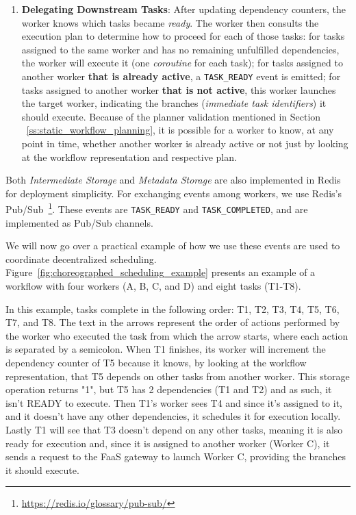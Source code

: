 \documentclass[conference]{IEEEtran}
\begin{document}
\begin{enumerate}
    \item \textbf{Delegating Downstream Tasks}: After updating dependency counters, the worker knows which tasks became \textit{ready}. The worker then consults the execution plan to determine how to proceed for each of those tasks: for tasks assigned to the same worker and has no remaining unfulfilled dependencies, the worker will execute it (one \textit{coroutine} for each task); for tasks assigned to another worker \textbf{that is already active}, a \texttt{TASK\_READY} event is emitted; for tasks assigned to another worker \textbf{that is not active}, this worker launches the target worker, indicating the branches (\textit{immediate task identifiers}) it should execute. Because of the planner validation mentioned in Section ~\ref{ss:static_workflow_planning}, it is possible for a worker to know, at any point in time, whether another worker is already active or not just by looking at the workflow representation and respective plan.
\end{enumerate}

Both \textit{Intermediate Storage} and \textit{Metadata Storage} are also implemented in Redis for deployment simplicity. For exchanging events among workers, we use Redis's Pub/Sub~\footnote{\url{https://redis.io/glossary/pub-sub/}}. These events are \texttt{TASK\_READY} and \texttt{TASK\_COMPLETED}, and are implemented as Pub/Sub channels. 

We will now go over a practical example of how we use these events are used to coordinate decentralized scheduling. Figure~\ref{fig:choreographed_scheduling_example} presents an example of a workflow with four workers (A, B, C, and D) and eight tasks (T1-T8).

In this example, tasks complete in the following order: T1, T2, T3, T4, T5, T6, T7, and T8. The text in the arrows represent the order of actions performed by the worker who executed the task from which the arrow starts, where each action is separated by a semicolon. When T1 finishes, its worker will increment the dependency counter of T5 because it knows, by looking at the workflow representation, that T5 depends on other tasks from another worker. This storage operation returns "1", but T5 has 2 dependencies (T1 and T2) and as such, it isn't READY to execute. Then T1's worker sees T4 and since it's assigned to it, and it doesn't have any other dependencies, it schedules it for execution locally. Lastly T1 will see that T3 doesn't depend on any other tasks, meaning it is also ready for execution and, since it is assigned to another worker (Worker C), it sends a request to the FaaS gateway to launch Worker C, providing the branches it should execute.
\end{document}
